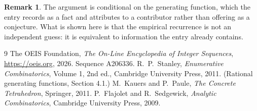 \documentclass[11pt,a4paper]{article}
\theoremstyle{plain}
\theoremstyle{definition}
\newtheorem{remark}[theorem]{Remark}
\begin{document}
\begin{remark}
The argument is conditional on the generating function, which the entry records as a fact and
attributes to a contributor rather than offering as a conjecture. What is shown here is that
the empirical recurrence is not an independent guess: it is equivalent to information the
entry already contains.
\end{remark}

\begin{thebibliography}{9}
 The OEIS Foundation, \emph{The On-Line Encyclopedia of Integer
Sequences}, \url{https://oeis.org}, 2026. Sequence A206336.
 R.~P.~Stanley, \emph{Enumerative Combinatorics}, Volume 1, 2nd ed.,
Cambridge University Press, 2011. (Rational generating functions, Section 4.1.)
 M.~Kauers and P.~Paule, \emph{The Concrete Tetrahedron}, Springer, 2011.
 P.~Flajolet and R.~Sedgewick, \emph{Analytic Combinatorics}, Cambridge
University Press, 2009.
\end{thebibliography}
\end{document}
